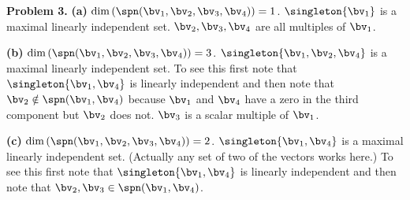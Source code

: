 \documentclass[oneside,12pt]{amsart}
\begin{document}
\bigskip

\newpage

\textbf{Problem 3.}
\textbf{(a)} $\dim\left(\spn(\bv_1,\bv_2,\bv_3,\bv_4)\right)=1$.
$\singleton{\bv_1}$ is a maximal linearly independent set. $\bv_2,\bv_3,\bv_4$
are all multiples of $\bv_1$.


\bigskip

\textbf{(b)} $\dim\left(\spn(\bv_1,\bv_2,\bv_3,\bv_4)\right)=3$.
$\singleton{\bv_1,\bv_2,\bv_4}$ is a maximal linearly independent set. To
see this first note that $\singleton{\bv_1,\bv_4}$ is linearly independent
and then note that $\bv_2\notin\spn(\bv_1,\bv_4)$ because $\bv_1$ and $\bv_4$
have a zero in the third component but $\bv_2$ does not. $\bv_3$ is a scalar
multiple of $\bv_1$.

\bigskip

\textbf{(c)} $\dim\left(\spn(\bv_1,\bv_2,\bv_3,\bv_4)\right)=2$.
$\singleton{\bv_1,\bv_4}$ is a maximal linearly independent set. (Actually
any set of two of the vectors works here.) To
see this first note that $\singleton{\bv_1,\bv_4}$ is linearly independent
and then note that $\bv_2,\bv_3\in\spn(\bv_1,\bv_4)$.

\bigskip
\end{document}
